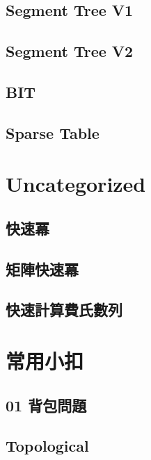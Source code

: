     \subsection{Segment Tree V1}
        
    \subsection{Segment Tree V2}
        
    \subsection{BIT}
        
    \subsection{Sparse Table}
        


\section{Uncategorized}
    \subsection{快速冪}
        
    \subsection{矩陣快速冪}
        
    \subsection{快速計算費氏數列}
        


\section{常用小扣}
    \subsection{01 背包問題}
        
    \subsection{Topological}
        
